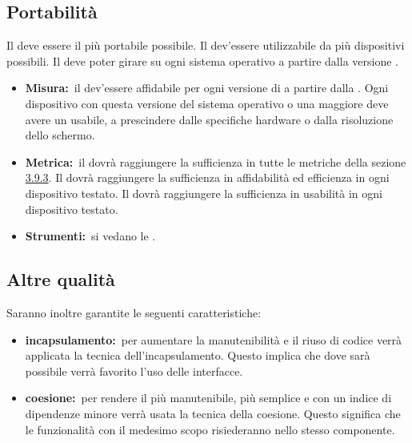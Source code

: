 	\subsection{Portabilità}
		Il  deve essere il più portabile possibile. Il  dev'essere utilizzabile da più dispositivi possibili. Il  deve poter girare su ogni sistema operativo  a partire dalla versione .
		\begin{itemize}
			\item \textbf{Misura:}\ il  dev'essere affidabile per ogni versione di  a partire dalla . Ogni dispositivo con questa versione del sistema operativo o una maggiore deve avere un  usabile, a prescindere dalle specifiche hardware o dalla risoluzione dello schermo.
			\item \textbf{Metrica:}\ il  dovrà raggiungere la sufficienza in tutte le metriche della sezione \hyperref[sec:Misure]{3.9.3}. Il  dovrà raggiungere la sufficienza in affidabilità ed efficienza in ogni dispositivo testato. Il  dovrà raggiungere la sufficienza in usabilità in ogni dispositivo testato.
			\item \textbf{Strumenti:}\ si vedano le \NPdoc.
		\end{itemize}
	\subsection{Altre qualità}
		Saranno inoltre garantite le seguenti caratteristiche:
		\begin{itemize}
			\item \textbf{incapsulamento:}\ per aumentare la manutenibilità e il riuso di codice verrà applicata la tecnica dell'incapsulamento. Questo implica che dove sarà possibile verrà favorito l'uso delle interfacce.
			\item \textbf{coesione:}\ per rendere il  più manutenibile, più semplice e con un indice di dipendenze minore verrà usata la tecnica della coesione. Questo significa che le funzionalità con il medesimo scopo risiederanno nello stesso componente.
		\end{itemize}